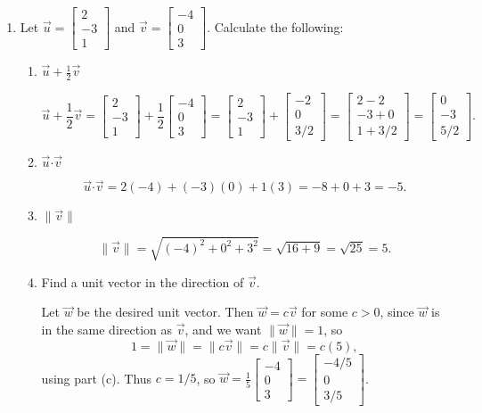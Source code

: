 \documentclass[12pt]{article}
\newcommand{\di}{\displaystyle}
\newcommand{\len}[1]{\lVert #1\rVert}
\newcommand{\dotp}{\boldsymbol{\cdot}}
\newcommand{\bbm}{\begin{bmatrix}}
\newcommand{\ebm}{\end{bmatrix}}
\begin{document}
\thispagestyle{fancy}
 \begin{enumerate}
 \item  Let $\vec{u} = \begin{bmatrix}2\\-3\\1\end{bmatrix}$ and $\vec{v} = \bbm -4\\0\\3\ebm$. Calculate the following:
\begin{enumerate}
 \item $\vec{u}+\frac{1}{2}\vec{v}$

\bigskip

\[
 \vec{u}+\frac{1}{2}\vec{v} = \begin{bmatrix}2\\-3\\1\end{bmatrix}+\frac{1}{2}\bbm -4\\0\\3\ebm = \bbm 2\\-3\\1\ebm+\bbm -2\\0\\3/2\ebm = \bbm 2-2\\-3+0\\1+3/2\ebm = \bbm 0\\-3\\5/2\ebm.
\]


 \item $\vec{u}\dotp \vec{v}$

\[
 \vec{u}\dotp \vec{v} = 2(-4)+(-3)(0)+1(3) = -8+0+3 = -5.
\]


 \item $\len{\vec{v}}$

\[
 \len{\vec{v}} = \sqrt{(-4)^2+0^2+3^2} = \sqrt{16+9} = \sqrt{25} = 5.
\]


 \item Find a unit vector in the direction of $\vec{v}$.

Let $\vec{w}$ be the desired unit vector. Then $\vec{w} = c\vec{v}$ for some $c>0$, since $\vec{w}$ is in the same direction as $\vec{v}$, and we want $\len{\vec{w}}=1$, so
\[
 1=\len{\vec{w}} = \len{c\vec{v}}=c\len{\vec{v}} = c(5),
\]
using part (c). Thus $c=1/5$, so $\di \vec{w} = \frac{1}{5}\bbm -4\\0\\3\ebm = \bbm -4/5\\0\\3/5\ebm$.


\end{enumerate}
\end{enumerate}
\end{document}
